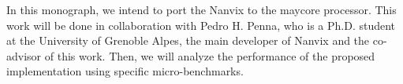     In this monograph, we intend to port the Nanvix \hal to the \mppa maycore processor. This work will be done in collaboration with Pedro H. Penna, who is a Ph.D. student at the University of Grenoble Alpes, the main developer of Nanvix and the co-advisor of this work. Then, we will analyze the performance of the proposed implementation using specific micro-benchmarks.

%
%    
    
